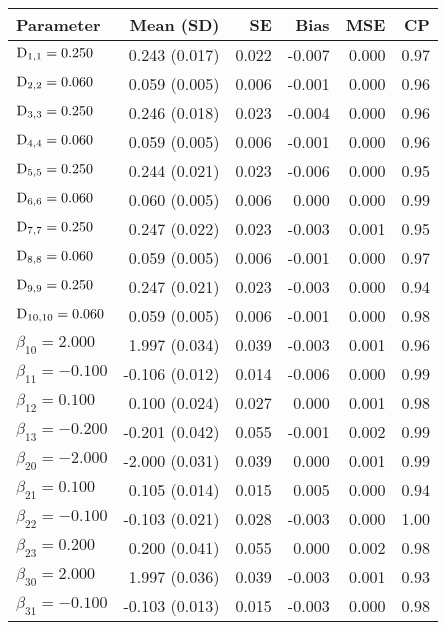 \begin{table}[ht]
\centering
{}
\captionsetup{font=scriptsize}
\begingroup\tiny
\begin{tabular}{l|rrrrr}
  Parameter & Mean (SD) & SE & Bias & MSE & CP \\ 
  \hline
  $\mathrm{D}_{1,1} = 0.250$ &  0.243 (0.017) & 0.022 & -0.007 & 0.000 & 0.97 \\ 
  $\mathrm{D}_{2,2} = 0.060$ &  0.059 (0.005) & 0.006 & -0.001 & 0.000 & 0.96 \\ 
  $\mathrm{D}_{3,3} = 0.250$ &  0.246 (0.018) & 0.023 & -0.004 & 0.000 & 0.96 \\ 
  $\mathrm{D}_{4,4} = 0.060$ &  0.059 (0.005) & 0.006 & -0.001 & 0.000 & 0.96 \\ 
  $\mathrm{D}_{5,5} = 0.250$ &  0.244 (0.021) & 0.023 & -0.006 & 0.000 & 0.95 \\ 
  $\mathrm{D}_{6,6} = 0.060$ &  0.060 (0.005) & 0.006 &  0.000 & 0.000 & 0.99 \\ 
  $\mathrm{D}_{7,7} = 0.250$ &  0.247 (0.022) & 0.023 & -0.003 & 0.001 & 0.95 \\ 
  $\mathrm{D}_{8,8} = 0.060$ &  0.059 (0.005) & 0.006 & -0.001 & 0.000 & 0.97 \\ 
  $\mathrm{D}_{9,9} = 0.250$ &  0.247 (0.021) & 0.023 & -0.003 & 0.000 & 0.94 \\ 
  $\mathrm{D}_{10,10} = 0.060$ &  0.059 (0.005) & 0.006 & -0.001 & 0.000 & 0.98 \\ 
  $\beta_{10} = 2.000$ &  1.997 (0.034) & 0.039 & -0.003 & 0.001 & 0.96 \\ 
  $\beta_{11} = -0.100$ & -0.106 (0.012) & 0.014 & -0.006 & 0.000 & 0.99 \\ 
  $\beta_{12} = 0.100$ &  0.100 (0.024) & 0.027 &  0.000 & 0.001 & 0.98 \\ 
  $\beta_{13} = -0.200$ & -0.201 (0.042) & 0.055 & -0.001 & 0.002 & 0.99 \\ 
  $\beta_{20} = -2.000$ & -2.000 (0.031) & 0.039 &  0.000 & 0.001 & 0.99 \\ 
  $\beta_{21} = 0.100$ &  0.105 (0.014) & 0.015 &  0.005 & 0.000 & 0.94 \\ 
  $\beta_{22} = -0.100$ & -0.103 (0.021) & 0.028 & -0.003 & 0.000 & 1.00 \\ 
  $\beta_{23} = 0.200$ &  0.200 (0.041) & 0.055 &  0.000 & 0.002 & 0.98 \\ 
  $\beta_{30} = 2.000$ &  1.997 (0.036) & 0.039 & -0.003 & 0.001 & 0.93 \\ 
  $\beta_{31} = -0.100$ & -0.103 (0.013) & 0.015 & -0.003 & 0.000 & 0.98 \\ 

\end{tabular}
\end{table}
